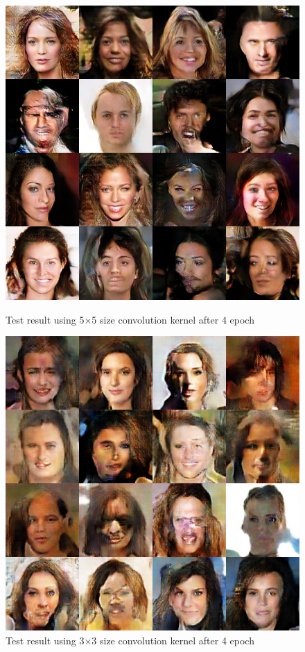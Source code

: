 \begin{figure}
    \begin{minipage}[t]{0.48\linewidth}
        \centering
        \includegraphics[width=\textwidth]{figures/result_conv_kernel_5.png}
        \caption{Test result using 5×5 size convolution kernel after 4 epoch}
        \label{conv_kernel_5}
    \end{minipage}
        \hfill
    \begin{minipage}[t]{0.48\linewidth}
        \centering
        \includegraphics[width=\textwidth]{figures/result_conv_kernel_3.png}
        \caption{Test result using 3×3 size convolution kernel after 4 epoch}
        \label{conv_kernel_3}
    \end{minipage}
\end{figure}



